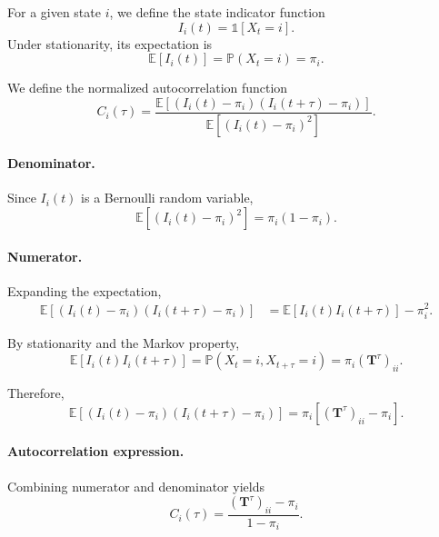 \documentclass[
    aps,
    prl,
    reprint,
    superscriptaddress,
    amsmath,amssymb,
    nofootinbib,
    floatfix
]{revtex4-2}
\begin{document}
For a given state $i$, we define the state indicator function
\begin{equation}
    I_i(t) = \mathbb{1}[X_t = i].
\end{equation}
Under stationarity, its expectation is
\begin{equation}
    \mathbb{E}[I_i(t)] = \mathbb{P}(X_t = i) = \pi_i.
\end{equation}

We define the normalized autocorrelation function
\begin{equation}
    C_i(\tau)
    =
    \frac{
        \mathbb{E}\!\left[(I_i(t)-\pi_i)(I_i(t+\tau)-\pi_i)\right]
    }{
        \mathbb{E}\!\left[(I_i(t)-\pi_i)^2\right]
    }.
\end{equation}

\paragraph{Denominator.}
Since $I_i(t)$ is a Bernoulli random variable,
\begin{equation}
    \mathbb{E}\!\left[(I_i(t)-\pi_i)^2\right]
    = \pi_i(1-\pi_i).
\end{equation}

\paragraph{Numerator.}
Expanding the expectation,
\begin{equation}
\begin{aligned}
    \mathbb{E}\!\left[(I_i(t)-\pi_i)(I_i(t+\tau)-\pi_i)\right]
    &=
    \mathbb{E}[I_i(t)I_i(t+\tau)] - \pi_i^2.
\end{aligned}
\end{equation}

By stationarity and the Markov property,
\begin{equation}
    \mathbb{E}[I_i(t)I_i(t+\tau)]
    =
    \mathbb{P}(X_t=i, X_{t+\tau}=i)
    =
    \pi_i (\mathbf{T}^\tau)_{ii}.
\end{equation}

Therefore,
\begin{equation}
    \mathbb{E}\!\left[(I_i(t)-\pi_i)(I_i(t+\tau)-\pi_i)\right]
    =
    \pi_i \left[(\mathbf{T}^\tau)_{ii} - \pi_i \right].
\end{equation}

\paragraph{Autocorrelation expression.}
Combining numerator and denominator yields
\begin{equation}
    C_i(\tau)
    =
    \frac{(\mathbf{T}^\tau)_{ii} - \pi_i}{1-\pi_i}.
\end{equation}
\end{document}
